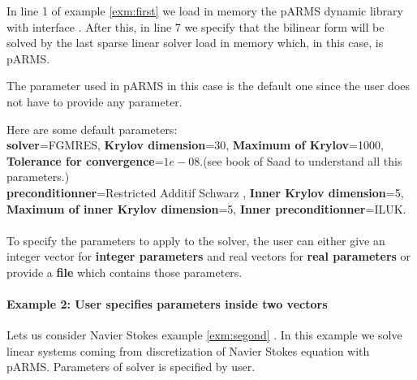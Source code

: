 \documentclass[a4paper,twoside,12pt]{book}
\begin{document}
In line 1 of example \ref{exm:first} we load in memory the pARMS dynamic library
with interface \freefempp.
After this, in line 7 we specify that the bilinear form will be solved by the
last sparse linear solver
load in memory which, in this case, is pARMS.


The parameter used in pARMS in this case is the default one since the user does
not have to provide any parameter.

 Here are some default parameters:\\
\textbf{solver}=FGMRES, \textbf{Krylov dimension}=30, \textbf{Maximum of
Krylov}=1000,
\textbf{Tolerance for convergence}=$1e-08$.(see book of Saad \cite{SAAD03} to
understand all this parameters.) \\
\textbf{preconditionner}=Restricted Additif Schwarz \cite{CAI89}, \textbf{Inner
Krylov dimension}=5,
\textbf{Maximum of inner Krylov dimension}=5, \textbf{Inner
preconditionner}=ILUK.
\\\\
To specify the parameters to apply to the solver, the user can either give an
integer
vector for \textbf{integer parameters} and real vectors for \textbf{real
parameters} or provide a \textbf{file} which contains those parameters.
\paragraph*{Example 2: User specifies parameters inside two
vectors}\label{vecparms}
Lets us consider Navier Stokes example \ref{exm:segond} . In this example we
solve linear systems coming from discretization
of Navier Stokes equation with pARMS. Parameters of solver is specified by
user.
\end{document}
